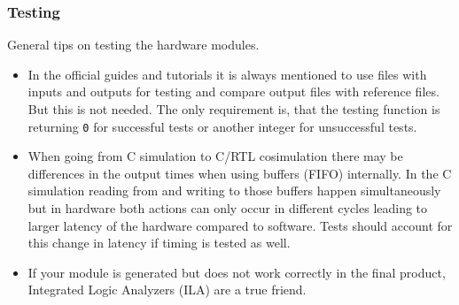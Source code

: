 \subsubsection{Testing}
General tips on testing the hardware modules.
\begin{itemize}
  \item In the official guides and tutorials it is always mentioned to use files with inputs and outputs for testing and compare output files with reference files. But this is not needed. The only requirement is, that the testing function is returning \texttt{0} for successful tests or another integer for unsuccessful tests.
  \item When going from C simulation to C/RTL cosimulation there may be differences in the output times when using buffers (FIFO) internally. In the C simulation reading from and writing to those buffers happen simultaneously but in hardware both actions can only occur in different cycles leading to larger latency of the hardware compared to software. Tests should account for this change in latency if timing is tested as well.
  \item If your module is generated but does not work correctly in the final product, Integrated Logic Analyzers (ILA) are a true friend.
\end{itemize}

